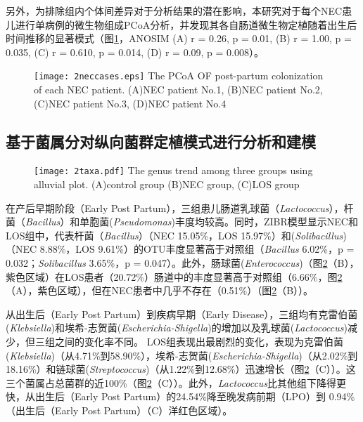 {{      另外，为排除组内个体间差异对于分析结果的潜在影响，本研究对于每个NEC患儿进行单病例的微生物组成PCoA分析，并发现其各自肠道微生物定植随着出生后时间推移的显著模式（图\ref{fig:2neccases}，ANOSIM (A) r = 0.26, p = 0.01, (B) r = 1.00, p = 0.035, (C) r = 0.610, p = 0.014, (D) r = 0.09, p = 0.008）。
          \begin{figure}[!htp]
            \centering
            \texttt{[image: 2neccases.eps]}
              {The PCoA OF post-partum colonization of each NEC patient. (A)NEC patient No.1, (B)NEC patient No.2, (C)NEC patient No.3, (D)NEC patient No.4}
            \label{fig:2neccases}
          \end{figure}

      \subsection{基于菌属分对纵向菌群定植模式进行分析和建模}
      \begin{figure}[!htp]
        \centering
        \texttt{[image: 2taxa.pdf]}
          {The genus trend among three groups using alluvial plot. (A)control group (B)NEC group, (C)LOS group}
        \label{fig:2taxa}
      \end{figure}

      在产后早期阶段（Early Post Partum），三组患儿肠道乳球菌（\textit{Lactococcus}），杆菌（\textit{Bacillus}）和单胞菌(\textit{Pseudomonas})丰度均较高。同时，ZIBR模型显示NEC和LOS组中，代表杆菌（\textit{Bacillus}）（NEC 15.05\%，LOS 15.97\%）和(\textit{Solibacillus})（NEC 8.88\%，LOS 9.61\%）的OTU丰度显著高于对照组（\textit{Bacillus} 6.02\%，p = 0.032；\textit{Solibacillus} 3.65\%，p = 0.047）。此外，肠球菌(\textit{Enterococcus})（图\ref{fig:2taxa}（B），紫色区域）在LOS患者（20.72\%）肠道中的丰度显著高于对照组（6.66\%，图\ref{fig:2taxa}（A），紫色区域），但在NEC患者中几乎不存在（0.51\%）（图\ref{fig:2taxa}（B））。

      从出生后（Early Post Partum）到疾病早期（Early Disease），三组均有克雷伯菌(\textit{Klebsiella})和埃希-志贺菌(\textit{Escherichia-Shigella})的增加以及乳球菌(\textit{Lactococcus})减少，但三组之间的变化率不同。 LOS组表现出最剧烈的变化，表现为克雷伯菌(\textit{Klebsiella})（从4.71\%到58.90\%），埃希-志贺菌(\textit{Escherichia-Shigella})（从2.02\%到18.16\%）和链球菌(\textit{Streptococcus})（从1.22\%到12.68\%）迅速增长（图\ref{fig:2taxa}（C））。这三个菌属占总菌群的近100\%（图\ref{fig:2taxa}（C））。此外，\textit{Lactococcus}比其他组下降得更快，从出生后（Early Post Partum）的24.54\%降至晚发病前期（LPO）到 0.94\%（出生后（Early Post Partum）（C）洋红色区域）。

}}
